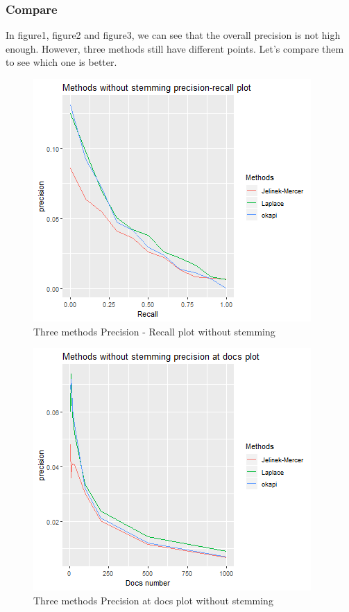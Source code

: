 \documentclass[a4pper,11pt,onecolumn]{article}
\begin{document}
\subsubsection{Compare}
In figure1, figure2 and figure3, we can see that the overall precision is not high enough. However, three methods still have different points. Let's compare them to see which one is better.

    \begin{figure}[H]
    \caption{Three methods Precision - Recall plot without stemming}
    \includegraphics[scale = 0.6]{no_stemming_pr.png}
    \centering
    \end{figure}

    \begin{figure}[H]
    \caption{Three methods Precision at docs plot without stemming}
    \includegraphics[scale = 0.6]{no_stemming_doc.png}
    \centering
    \end{figure}
\end{document}
